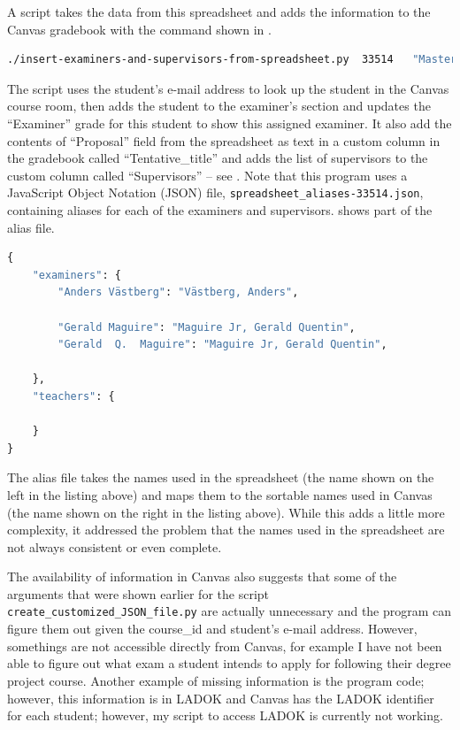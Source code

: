 A script takes the data from this spreadsheet and adds the information to the Canvas gradebook with the command shown in .
\begin{lstlisting}[language={bash}, caption={insert-examiners-and-supervisors-from-spreadsheet.py}, label=lst:insertExaminersAndSupervisorsFromSpreadsheet]
./insert-examiners-and-supervisors-from-spreadsheet.py  33514   "Masters_thesis_proposals-CS-P3-2022a.xlsx"  
\end{lstlisting}
The script uses the student’s e-mail address to look up the student in the Canvas course room, then adds the student to the examiner’s section and updates the “Examiner” grade for this student to show this assigned examiner. It also add the contents of “Proposal” field from the spreadsheet as text in a custom column in the gradebook called “Tentative\_title” and adds the list of supervisors to the custom column called “Supervisors” – see . Note that this program uses a JavaScript Object Notation (JSON) file, \texttt{spreadsheet\_aliases-33514.json}, containing aliases for each of the examiners and supervisors.  shows part of the alias file.
\begin{lstlisting}[language={Python}, caption={Some of the contents of an alias file for a course}, label=lst:aliasFile]
{
    "examiners": {
        "Anders Västberg": "Västberg, Anders",

        "Gerald Maguire": "Maguire Jr, Gerald Quentin",
        "Gerald  Q.  Maguire": "Maguire Jr, Gerald Quentin",

    },
    "teachers": {
    
    }
}
\end{lstlisting}

The alias file takes the names used in the spreadsheet (the name shown on the left in the listing above) and maps them to the sortable names used in Canvas (the name shown on the right in the listing above). While this adds a little more complexity, it addressed the problem that the names used in the spreadsheet are not always consistent or even complete.

The availability of information in Canvas also suggests that some of the arguments that were shown earlier for the script \texttt{create\_customized\_JSON\_file.py} are actually unnecessary and the program can figure them out given the course\_id and student’s e-mail address. However, somethings are not accessible directly from Canvas, for example I have not been able to figure out what exam a student intends to apply for following their degree project course. Another example of missing information is the program code; however, this information is in LADOK and Canvas has the LADOK identifier for each student; however, my script to access LADOK is currently not working.
